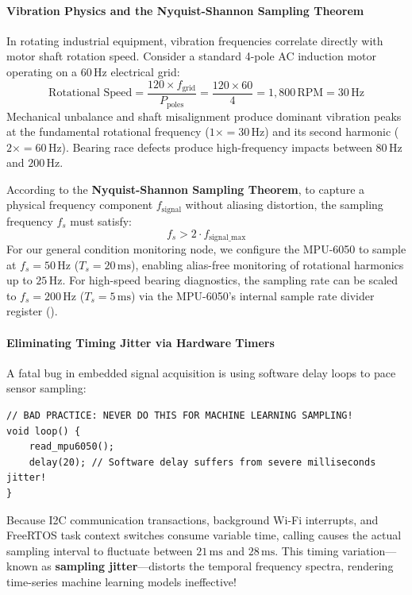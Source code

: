 \paragraph{Vibration Physics and the Nyquist-Shannon Sampling Theorem}
In rotating industrial equipment, vibration frequencies correlate directly with motor shaft rotation speed. Consider a standard 4-pole AC induction motor operating on a $60\,\text{Hz}$ electrical grid:
\begin{equation}
\text{Rotational Speed} = \frac{120 \times f_{\text{grid}}}{P_{\text{poles}}} = \frac{120 \times 60}{4} = 1{,}800\,\text{RPM} = 30\,\text{Hz}
\end{equation}
Mechanical unbalance and shaft misalignment produce dominant vibration peaks at the fundamental rotational frequency ($1\times = 30\,\text{Hz}$) and its second harmonic ($2\times = 60\,\text{Hz}$). Bearing race defects produce high-frequency impacts between $80\,\text{Hz}$ and $200\,\text{Hz}$.

According to the \textbf{Nyquist-Shannon Sampling Theorem}, to capture a physical frequency component $f_{\text{signal}}$ without aliasing distortion, the sampling frequency $f_s$ must satisfy:
\begin{equation}
f_s > 2 \cdot f_{\text{signal\_max}}
\end{equation}
For our general condition monitoring node, we configure the MPU-6050 to sample at $f_s = 50\,\text{Hz}$ ($T_s = 20\,\text{ms}$), enabling alias-free monitoring of rotational harmonics up to $25\,\text{Hz}$. For high-speed bearing diagnostics, the sampling rate can be scaled to $f_s = 200\,\text{Hz}$ ($T_s = 5\,\text{ms}$) via the MPU-6050's internal sample rate divider register ().

\paragraph{Eliminating Timing Jitter via Hardware Timers}
A fatal bug in embedded signal acquisition is using software delay loops to pace sensor sampling:
\begin{lstlisting}[style=pythonstyle, numbers=none]
// BAD PRACTICE: NEVER DO THIS FOR MACHINE LEARNING SAMPLING!
void loop() {
    read_mpu6050();
    delay(20); // Software delay suffers from severe milliseconds jitter!
}
\end{lstlisting}
Because I2C communication transactions, background Wi-Fi interrupts, and FreeRTOS task context switches consume variable time, calling  causes the actual sampling interval to fluctuate between $21\,\text{ms}$ and $28\,\text{ms}$. This timing variation---known as \textbf{sampling jitter}---distorts the temporal frequency spectra, rendering time-series machine learning models ineffective!

